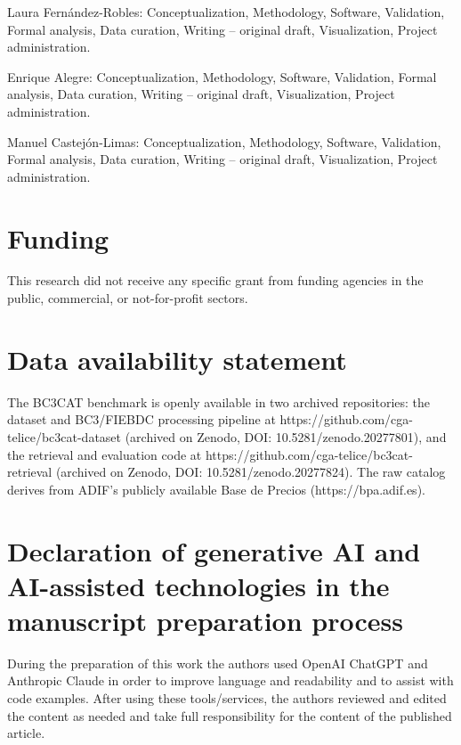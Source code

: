 \documentclass[preprint,12pt]{elsarticle}
\begin{document}
Laura Fernández-Robles: Conceptualization, Methodology, Software, Validation, Formal analysis, Data curation, Writing – original draft, Visualization, Project administration.

Enrique Alegre: Conceptualization, Methodology, Software, Validation, Formal analysis, Data curation, Writing – original draft, Visualization, Project administration.

Manuel Castejón-Limas: Conceptualization, Methodology, Software, Validation, Formal analysis, Data curation, Writing – original draft, Visualization, Project administration.

\section*{Funding}

This research did not receive any specific grant from funding agencies in the public, commercial, or not-for-profit sectors.

\section*{Data availability statement}

The BC3CAT benchmark is openly available in two archived repositories: the dataset and BC3/FIEBDC processing pipeline at https://github.com/cga-telice/bc3cat-dataset (archived on Zenodo, DOI: 10.5281/zenodo.20277801), and the retrieval and evaluation code at https://github.com/cga-telice/bc3cat-retrieval (archived on Zenodo, DOI: 10.5281/zenodo.20277824). The raw catalog derives from ADIF's publicly available Base de Precios (https://bpa.adif.es).

\section*{Declaration of generative AI and AI-assisted technologies in the manuscript preparation process}

During the preparation of this work the authors used OpenAI ChatGPT and Anthropic
Claude in order to improve language and readability and to assist with code examples.
After using these tools/services, the authors reviewed and edited the content as
needed and take full responsibility for the content of the published article.
 

\end{document}
